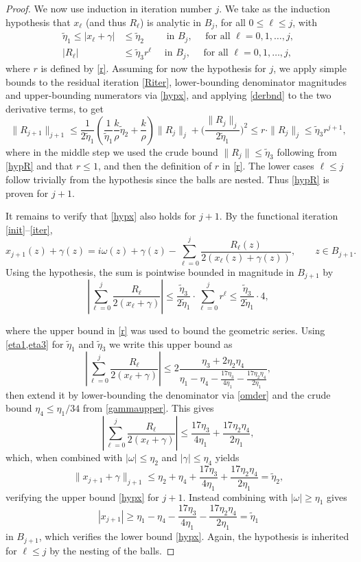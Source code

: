 \documentclass[10pt]{article}
\newcommand{\om}{\omega}
\newcommand{\g}{\gamma}
\newcommand{\te}{\tilde\eta}
\begin{document}
\begin{proof}
  We now use induction in iteration number $j$.
    We take as the induction hypothesis that $x_\ell$ (and thus $R_\ell$)
  is analytic in $B_j$, for all $0\le \ell \le j$, with
  \begin{align}
      \te_1 \leq |x_\ell + \g| &\leq \te_2
  \qquad \mbox{ in } B_j, \quad \mbox{ for all } \ell = 0,1,\dots,j,
  \label{hypx} \\
      |R_\ell| &\leq \te_3 r^\ell \quad \mbox{ in } B_j, \quad \mbox{ for all } \ell = 0,1,\dots,j,
  \label{hypR}
  \end{align}
  where $r$ is defined by \cref{r}.
  Assuming for now the hypothesis for $j$, we apply simple bounds to the
  residual iteration \cref{Riter},
  lower-bounding denominator magnitudes and upper-bounding numerators
  via \cref{hypx},
  and applying \cref{derbnd} to the two derivative terms, to get
  $$
  \|R_{j+1}\|_{j+1}
  \leq
  \frac{1}{2\te_1}\left(
  \frac{1}{\te_1} \frac{k}{\rho}\te_2 + \frac{k}{\rho}
  \right)\|R_j\|_j
  +\biggl(\frac{\|R_j\|_j}{2\te_1}\biggr)^2
  \leq
  r \cdot \|R_j\|_j
  \leq
  \te_3 r^{j+1},
  $$
where in the middle step we used the crude bound $\|R_j\| \le \te_3$
following from \cref{hypR} and that $r\le1$, and then the definition of $r$ in \cref{r}.
The lower cases $\ell\le j$ follow trivially from the hypothesis since the balls
are nested.
Thus \cref{hypR} is proven for $j+1$.

It remains to verify that \cref{hypx} also holds for $j+1$.
By the functional iteration \cref{init}--\cref{iter},
$$
x_{j+1}(z) + \g(z) = i\om(z) + \g(z) - \sum_{\ell=0}^{j} \frac{R_\ell(z)}{2 \left(x_\ell(z) + \g(z)\right)},
\qquad z\in B_{j+1}.
$$
Using the hypothesis, the sum is pointwise bounded in magnitude
in $B_{j+1}$ by
$$
\left|\sum_{\ell=0}^{j} \frac{R_\ell}{2\left( x_\ell + \g \right)} \right|
\leq \frac{\te_3}{2\te_1} \cdot \sum_{\ell=0}^j r^{\ell}
\leq \frac{\te_3}{2\te_1} \cdot 4,
$$

where the upper bound in \cref{r} was used to bound the geometric series.
Using \cref{eta1,eta3} for $\te_1$ and $\te_3$ we write this upper bound as
$$
\left|\sum_{\ell=0}^{j} \frac{R_\ell}{2\left( x_\ell + \g \right)} \right|
\leq
2\frac{\eta_3 + 2\eta_2\eta_4}{\eta_1 - \eta_4 - \frac{17\eta_3}{4\eta_1} - \frac{17\eta_2\eta_4}{2\eta_1}},
$$
then extend it by lower-bounding the denominator via \cref{omder} and the crude bound ${\eta_4 \leq \eta_1/34}$ from \cref{gammaupper}. This gives
$$
\left|\sum_{\ell=0}^{j} \frac{R_\ell}{2\left( x_\ell + \g \right)} \right| 
\leq
\frac{17\eta_3}{4\eta_1} + \frac{17\eta_2\eta_4}{2\eta_1},
$$
which, when combined with $|\om| \leq \eta_2$ and $|\g| \leq \eta_4$ yields
$$\|x_{j+1} + \g\|_{j+1} \le \eta_2 + \eta_4 + \frac{17\eta_3}{4\eta_1} + \frac{17\eta_2\eta_4}{2\eta_1} = \te_2,$$
verifying the upper bound \cref{hypx} for $j+1$.
Instead combining with $|\om| \ge \eta_1$ gives
$$ |x_{j+1}| \ge \eta_1 - \eta_4 - \frac{17\eta_3}{4\eta_1} - \frac{17\eta_2\eta_4}{2\eta_1} = \te_1 $$
in $B_{j+1}$, which verifies the lower bound \cref{hypx}.
Again, the hypothesis is inherited for $\ell\le j$ by the nesting of the balls.


\end{proof}
\end{document}
